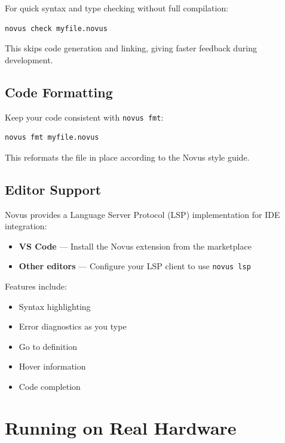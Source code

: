 For quick syntax and type checking without full compilation:

\begin{lstlisting}[language=bash]
novus check myfile.novus
\end{lstlisting}

This skips code generation and linking, giving faster feedback during development.

\subsection{Code Formatting}

Keep your code consistent with \texttt{novus fmt}:

\begin{lstlisting}[language=bash]
novus fmt myfile.novus
\end{lstlisting}

This reformats the file in place according to the Novus style guide.

\subsection{Editor Support}

Novus provides a Language Server Protocol (LSP) implementation for IDE integration:
\begin{itemize}
    \item \textbf{VS Code} --- Install the Novus extension from the marketplace
    \item \textbf{Other editors} --- Configure your LSP client to use \texttt{novus lsp}
\end{itemize}

Features include:
\begin{itemize}
    \item Syntax highlighting
    \item Error diagnostics as you type
    \item Go to definition
    \item Hover information
    \item Code completion
\end{itemize}

\section{Running on Real Hardware}
\label{sec:real-hardware}

